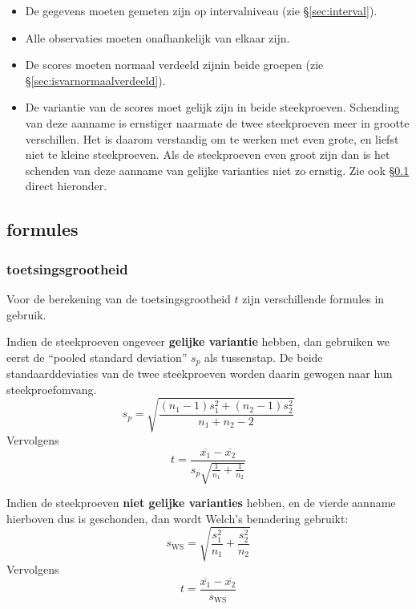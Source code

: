 \documentclass[
]{book}
\begin{document}
\begin{itemize}
\item
  De gegevens moeten gemeten zijn op intervalniveau (zie
  §\ref{sec:interval}).
\item
  Alle observaties moeten onafhankelijk van elkaar zijn.
\item
  De scores moeten normaal verdeeld zijnin beide groepen (zie
  §\ref{sec:isvarnormaalverdeeld}).
\item
  De variantie van de scores moet gelijk zijn in beide
  steekproeven. Schending van deze aanname is ernstiger naarmate de twee
  steekproeven meer in grootte verschillen. Het is daarom verstandig om te
  werken met even grote, en liefst niet te kleine steekproeven. Als de
  steekproeven even groot zijn dan is het schenden van deze aanname van
  gelijke varianties niet zo ernstig.
  Zie ook §\ref{sec:ttoets-formules} direct hieronder.
\end{itemize}

\hypertarget{sec:ttoets-formules}{%
\subsection{formules}\label{sec:ttoets-formules}}

\hypertarget{toetsingsgrootheid}{%
\subsubsection{toetsingsgrootheid}\label{toetsingsgrootheid}}

Voor de berekening van de toetsingsgrootheid \(t\) zijn verschillende
formules in gebruik.

Indien de steekproeven ongeveer \textbf{gelijke variantie} hebben, dan gebruiken
we eerst de ``pooled standard deviation'' \(s_p\) als tussenstap. De beide
standaarddeviaties van de twee steekproeven worden daarin gewogen naar
hun steekproefomvang.
\begin{equation}
    s_p = \sqrt{ \frac{(n_1-1) s^2_1 + (n_2-1) s^2_2} {n_1+n_2-2} }
    \label{eq:sd-pooled}
\end{equation}
Vervolgens
\begin{equation}
  \label{eq:t-homoskedastic}
  t = \frac{ \overline{x_1}-\overline{x_2} } { s_p \sqrt{\frac{1}{n_1}+\frac{1}{n_2}} }
\end{equation}

Indien de steekproeven \textbf{niet gelijke varianties} hebben, en de vierde
aanname hierboven dus is geschonden, dan wordt Welch's benadering
gebruikt:
\begin{equation}
  \label{eq:sd-WS}
  s_{\textrm{WS}} = \sqrt{\frac{s^2_1}{n_1}+\frac{s^2_2}{n_2} }
\end{equation}
Vervolgens
\begin{equation}
  \label{eq:t-WS}
  t = \frac{ \overline{x_1}-\overline{x_2} } { s_{\textrm{WS}} }
\end{equation}
\end{document}
